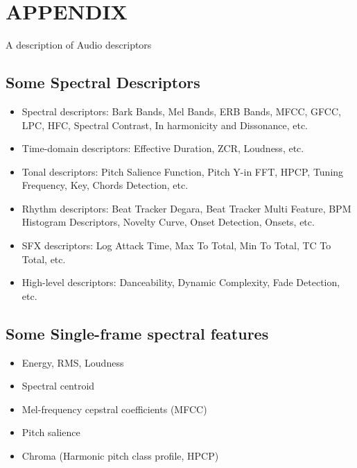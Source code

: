 \documentclass[letterpaper, 10 pt, conference]{ieeeconf}
\begin{document}
\pagebreak 
\section*{APPENDIX}
A description of Audio descriptors
\subsection{Some Spectral Descriptors}
\begin{itemize}
\item Spectral descriptors: Bark Bands, Mel Bands, ERB Bands, MFCC, GFCC, LPC, HFC, Spectral Contrast, In harmonicity and Dissonance, etc.
\item Time-domain descriptors: Effective Duration, ZCR, Loudness, etc.
\item Tonal descriptors: Pitch Salience Function, Pitch Y-in FFT, HPCP, Tuning Frequency, Key, Chords Detection, etc.
\item Rhythm descriptors: Beat Tracker Degara, Beat Tracker Multi Feature, BPM Histogram Descriptors, Novelty Curve, Onset Detection, Onsets, etc.
\item SFX descriptors: Log Attack Time, Max To Total, Min To Total, TC To Total, etc.
\item High-level descriptors: Danceability, Dynamic Complexity, Fade Detection, etc.
\end{itemize}

\subsection{Some Single-frame spectral features}
\begin{itemize}
\item Energy, RMS, Loudness
\item Spectral centroid
\item Mel-frequency cepstral coefficients (MFCC)
\item Pitch salience
\item Chroma (Harmonic pitch class profile, HPCP)
\end{itemize}
\end{document}
